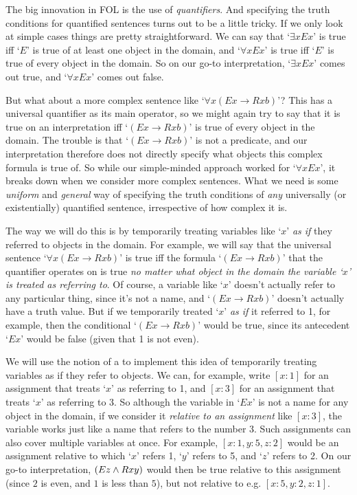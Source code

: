 The big innovation in FOL is the use of \emph{quantifiers}. And specifying the truth conditions for quantified sentences turns out to be a little tricky.  If we only look at simple cases things are pretty straightforward.  We can say that `$\exists xEx$' is true iff `$E$' is true of at least one object in the domain, and  `$\forall xEx$' is true iff `$E$' is true of every object in the domain.  So on our go-to interpretation, `$\exists xEx$' comes out true, and `$\forall xEx$' comes out false.


But what about a more complex sentence like `$\forall x(Ex \rightarrow Rxb)$'?  This has a universal quantifier as its main operator, so we might again try to say that it is true on an interpretation iff `$(Ex \rightarrow Rxb)$' is true of every object in the domain.  The trouble is that `$(Ex \rightarrow Rxb)$' is not a predicate, and our interpretation therefore does not directly specify what objects this complex formula is true of.  So while our simple-minded approach worked for `$\forall xEx$', it breaks down when we consider more complex sentences.  What we need is some \emph{uniform} and \emph{general} way of specifying the truth conditions of \emph{any} universally (or existentially) quantified sentence, irrespective of how complex it is.


The way we will do this is by temporarily treating variables like `$x$' \emph{as if} they referred to objects in the domain.  For example, we will say that the universal sentence `$\forall x(Ex \rightarrow Rxb)$' is true iff the formula `$(Ex \rightarrow Rxb)$' that the quantifier operates on is true \emph{no matter what object in the domain the variable `$x$'  is treated as referring to}. Of course, a variable like `$x$' doesn't actually refer to any particular thing, since it's not a name, and `$(Ex \rightarrow Rxb)$' doesn't actually have a truth value.  But if we temporarily treated `$x$' \emph{as if} it referred to 1, for example, then the conditional `$(Ex \rightarrow Rxb)$' would be true, since its antecedent `$Ex$' would be false (given that 1 is not even).


We will use the notion of a  to implement this idea of temporarily treating variables as if they refer to objects.  We can, for example, write $[x:1]$ for an assignment that treats `$x$' as referring to 1, and $[x:3]$ for an assignment that treats `$x$' as referring to 3.  So although the variable in `$Ex$' is not a name for any object in the domain, if we consider it \emph{relative to an assignment} like $[x:3]$, the variable works just like a name that refers to the number 3.  Such assignments can also cover multiple variables at once.  For example, $[x: 1, y:5, z:2]$ would be an assignment relative to which `$x$' refers 1, `$y$' refers to 5, and `$z$' refers to 2.  On our go-to interpretation, $(Ez \wedge Rxy)$ would then be true relative to this assignment (since $2$ is even, and $1$ is less than $5$), but not relative to e.g. $[x:5, y: 2, z: 1]$.

